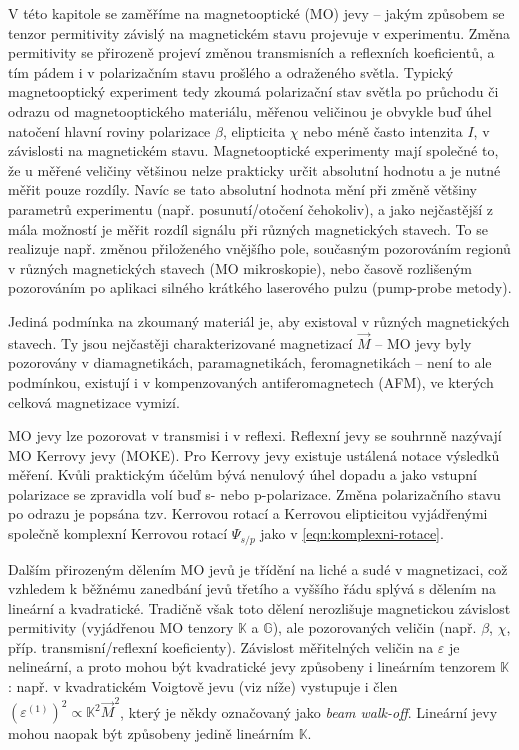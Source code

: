 V této kapitole se zaměříme na magnetooptické (MO) jevy -- jakým způsobem se tenzor permitivity závislý na magnetickém stavu projevuje v experimentu.
Změna permitivity se přirozeně projeví změnou transmisních a reflexních koeficientů, a tím pádem i v polarizačním stavu prošlého a odraženého světla.
Typický magnetooptický experiment tedy zkoumá polarizační stav světla po průchodu či odrazu od magnetooptického materiálu, měřenou veličinou je obvykle buď úhel natočení hlavní roviny polarizace $\beta$, elipticita $\chi$ nebo méně často intenzita $I$, v závislosti na magnetickém stavu.
Magnetooptické experimenty mají společné to, že u měřené veličiny většinou nelze prakticky určit absolutní hodnotu a je nutné měřit pouze rozdíly\cite{silberQuadraticMagnetoopticKerr2019a}.
Navíc se tato absolutní hodnota mění při změně většiny parametrů experimentu (např. posunutí/otočení čehokoliv), a jako nejčastější z mála možností je měřit rozdíl signálu při různých magnetických stavech.
To se realizuje např. změnou přiloženého vnějšího pole, současným pozorováním regionů v různých magnetických stavech (MO mikroskopie), nebo časově rozlišeným pozorováním po aplikaci silného krátkého laserového pulzu (pump-probe metody).

Jediná podmínka na zkoumaný materiál je, aby existoval v různých magnetických stavech.
Ty jsou nejčastěji charakterizované magnetizací $\vec{M}$ -- MO jevy byly pozorovány v diamagnetikách, paramagnetikách, feromagnetikách --
není to ale podmínkou, existují i v kompenzovaných antiferomagnetech (AFM)\cite{saidlOpticalDeterminationNeel2017}, ve kterých celková magnetizace vymizí.

MO jevy lze pozorovat v transmisi i v reflexi.
Reflexní jevy se souhrnně nazývají MO Kerrovy jevy (MOKE).
Pro Kerrovy jevy existuje ustálená notace výsledků měření\cite{silberQuadraticMagnetoopticKerr2019a}.
Kvůli praktickým účelům bývá nenulový úhel dopadu a jako vstupní polarizace se zpravidla volí buď s- nebo p-polarizace. 
Změna polarizačního stavu po odrazu je popsána tzv. Kerrovou rotací a Kerrovou elipticitou vyjádřenými společně komplexní Kerrovou rotací $\Psi_{s/p}$ jako v \eqref{eqn:komplexni-rotace}.

Dalším přirozeným dělením MO jevů je třídění na liché a sudé v magnetizaci, což vzhledem k běžnému zanedbání jevů třetího a vyššího řádu splývá s dělením na lineární a kvadratické.
Tradičně však toto dělení nerozlišuje magnetickou závislost permitivity (vyjádřenou MO tenzory $\mathbb{K}$ a $\mathbb{G}$), ale pozorovaných veličin (např. $\beta$, $\chi$, příp. transmisní/reflexní koeficienty). 
Závislost měřitelných veličin na $\varepsilon$ je nelineární, a proto mohou být kvadratické jevy způsobeny i lineárním tenzorem $\mathbb{K}$: např. v kvadratickém Voigtově jevu (viz níže) vystupuje i člen $\left(\varepsilon^{(1)}\right)^2 \propto \mathbb{K}^2 \vec{M}^2$, který je někdy označovaný jako \emph{beam walk-off}\cite{akbarLowTemperatureVoigt2017}.
Lineární jevy mohou naopak být způsobeny jedině lineárním $\mathbb{K}$.

